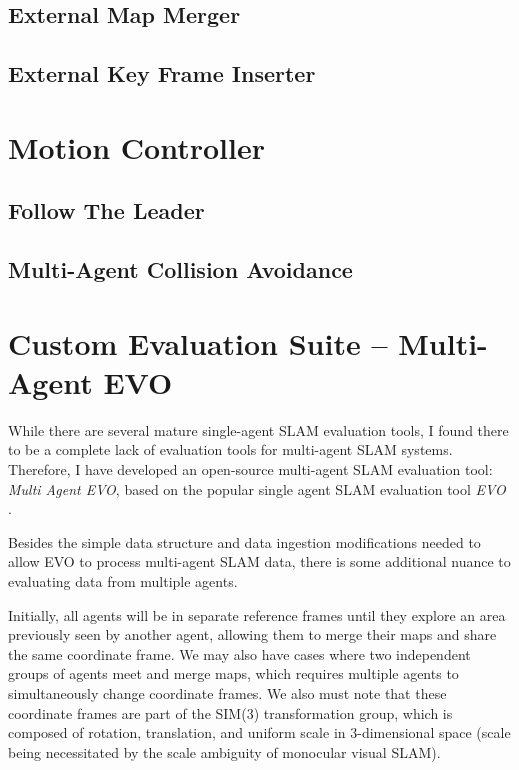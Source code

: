 \subsection{External Map Merger}
\label{sec:external-map-merger}

\subsection{External Key Frame Inserter}
\label{sec:external-key-frame-inserter}

\section{Motion Controller}
\label{sec:motion-controller}

\subsection{Follow The Leader}
\label{sec:follow-the-leader}

\subsection{Multi-Agent Collision Avoidance}
\label{sec:multi-agent-collision-avoidance}

\section{Custom Evaluation Suite – Multi-Agent EVO}
\label{sec:multi-agent-evo}
While there are several mature single-agent SLAM evaluation tools, I found there to be a complete lack of evaluation tools for multi-agent SLAM systems. Therefore, I have developed an open-source multi-agent SLAM evaluation tool: \textit{Multi Agent EVO}, based on the popular single agent SLAM evaluation tool \textit{EVO} \autocite{grupp2017evo}.

Besides the simple data structure and data ingestion modifications needed to allow EVO to process multi-agent SLAM data, there is some additional nuance to evaluating data from multiple agents.

Initially, all agents will be in separate reference frames until they explore an area previously seen by another agent, allowing them to merge their maps and share the same coordinate frame. We may also have cases where two independent groups of agents meet and merge maps, which requires multiple agents to simultaneously change coordinate frames. We also must note that these coordinate frames are part of the SIM(3) transformation group, which is composed of rotation, translation, and uniform scale in 3-dimensional space (scale being necessitated by the scale ambiguity of monocular visual SLAM).

